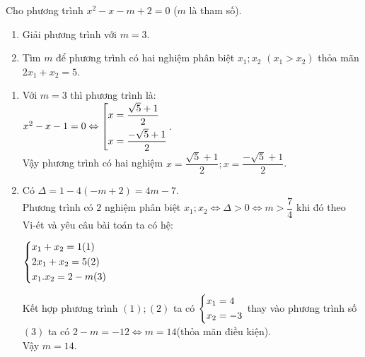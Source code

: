 \begin{ex}%

	Cho phương trình $x^2-x-m + 2 = 0$ ($m$ là tham số).
	\begin{enumerate}
		\item Giải phương trình với $m = 3$.
		\item Tìm $m$ để phương trình có hai nghiệm phân biệt $x_1; x_2$ $(x_1>x_2)$ thỏa mãn $2x_1 + x_2 = 5$.
	\end{enumerate}
	\loigiai
	{\begin{enumerate}
			\item Với $m=3$ thì phương trình là:\\
			$x^2-x-1 = 0\Leftrightarrow\left[\begin{aligned}&x=\dfrac{\sqrt{5}+1}{2}\\&x=\dfrac{-\sqrt{5}+1}{2}\end{aligned}\right.$.\\
			Vậy phương trình có hai nghiệm $x=\dfrac{\sqrt{5}+1}{2};x=\dfrac{-\sqrt{5}+1}{2}$.
			\item Có $\Delta=1-4(-m+2)=4m-7$.\\
			Phương trình có $2$ nghiệm phân biệt $x_1;x_2\Leftrightarrow\Delta>0\Leftrightarrow m>\dfrac{7}{4}$ khi đó theo Vi-ét và yêu câu bài toán ta có hệ:
			\begin{center}
			$\left\{\begin{aligned}&x_1+x_2=1 (1)\\&2x_1+x_2=5 (2)\\&x_1.x_2=2-m (3)\end{aligned}\right.$
		\end{center}
			Kết hợp phương trình $(1);(2)$ ta có $\left\{\begin{aligned}&x_1=4\\&x_2=-3\end{aligned}\right.$ thay vào phương trình số $(3)$ ta có $2-m=-12\Leftrightarrow m=14$(thỏa mãn điều kiện).\\
			Vậy $m=14$.
		\end{enumerate}
		
	} 
\end{ex}
